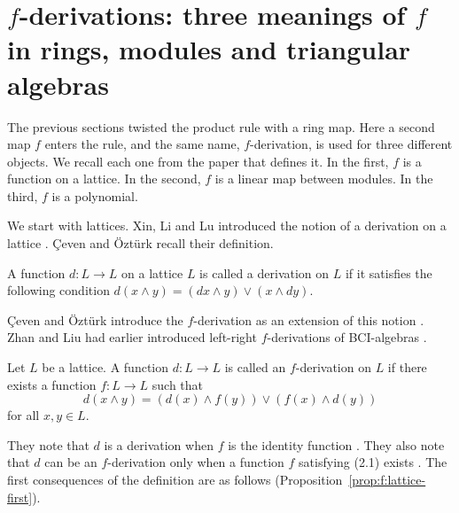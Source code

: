 \section{$f$-derivations: three meanings of $f$ in rings, modules and triangular algebras}\label{sec:generalized-twisted:f-derivations}

The previous sections twisted the product rule with a ring map. Here a second map $f$
enters the rule, and the same name, $f$-derivation, is used for three different
objects. We recall each one from the paper that defines it. In the first, $f$ is a
function on a lattice. In the second, $f$ is a linear map between modules. In the
third, $f$ is a polynomial.

We start with lattices. Xin, Li and Lu introduced the notion of a derivation on a
lattice \cite[p.~701]{CevenOzturk2008}. Çeven and Öztürk recall their definition.

\begin{definition}\label{def:f:lattice-derivation}
A function $d:L\to L$ on a lattice $L$ is called a derivation on $L$ if it satisfies
the following condition
$d(x\wedge y)=(dx\wedge y)\vee(x\wedge dy)$.
\end{definition}

Çeven and Öztürk introduce the $f$-derivation as an extension of this notion
\cite[p.~701]{CevenOzturk2008}. Zhan and Liu had earlier introduced left-right
$f$-derivations of BCI-algebras \cite[p.~701]{CevenOzturk2008}.

\begin{definition}\label{def:f:lattice}
Let $L$ be a lattice. A function $d:L\to L$ is called an $f$-derivation on $L$ if there
exists a function $f:L\to L$ such that
\[ d(x\wedge y)=(d(x)\wedge f(y))\vee(f(x)\wedge d(y)) \tag{2.1} \]
for all $x,y\in L$.
\end{definition}

They note that $d$ is a derivation when $f$ is the identity function
\cite[p.~702]{CevenOzturk2008}. They also note that $d$ can be an $f$-derivation only
when a function $f$ satisfying (2.1) exists \cite[p.~702]{CevenOzturk2008}. The first
consequences of the definition are as follows (Proposition~\ref{prop:f:lattice-first}).

